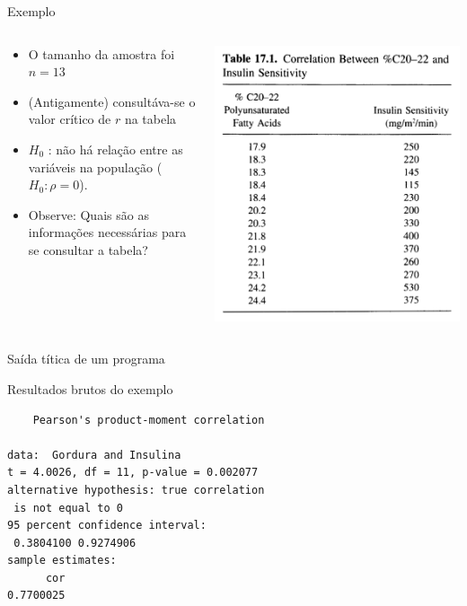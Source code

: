 \documentclass{beamer}
\begin{document}
\begin{frame}{Exemplo}
  \begin{columns}
    \begin{column}{5cm}
      \begin{itemize}
      \item O tamanho da amostra foi $n=13$
      \item (Antigamente) consultáva-se o valor crítico de $r$ na tabela
      \item $H_0$ : não há relação entre as variáveis na população ($H_0: \rho = 0$).
      \item Observe: Quais são as informações necessárias para se consultar a tabela?
      \end{itemize}
    \end{column}
    \begin{column}{5cm}
      \includegraphics[height=0.8\textheight]{Cap17/table}
    \end{column}
  \end{columns}
\end{frame}

\begin{frame}[fragile]{Saída títica de um programa}
  \begin{exampleblock}{Resultados brutos do exemplo}
    \footnotesize
\begin{verbatim}
	Pearson's product-moment correlation

data:  Gordura and Insulina
t = 4.0026, df = 11, p-value = 0.002077
alternative hypothesis: true correlation
 is not equal to 0
95 percent confidence interval:
 0.3804100 0.9274906
sample estimates:
      cor
0.7700025
\end{verbatim}
  \end{exampleblock}
\end{frame}
\end{document}
